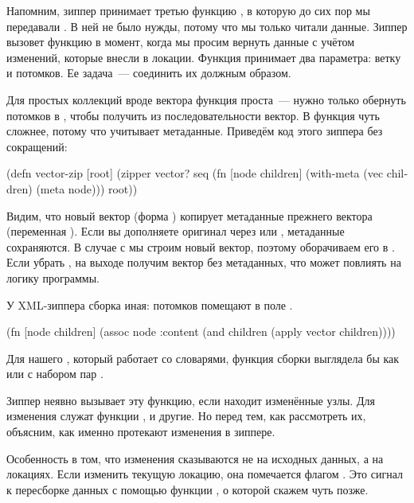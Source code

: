 Напомним, зиппер принимает третью функцию , в которую до сих пор мы
передавали . В ней не было нужды, потому что мы только читали
данные. Зиппер вызовет функцию в момент, когда мы просим вернуть данные с учётом
изменений, которые внесли в локации. Функция принимает два параметра: ветку и
потомков. Ее задача~--- соединить их должным образом.

Для простых коллекций вроде вектора функция проста~--- нужно только обернуть
потомков в , чтобы получить из последовательности вектор. В 
функция чуть сложнее, потому что учитывает метаданные. Приведём код этого
зиппера без сокращений:

\begin{english}
  \begin{clojure}
(defn vector-zip
  [root]
  (zipper vector?
          seq
          (fn [node children]
            (with-meta (vec children) (meta node)))
          root))
  \end{clojure}
\end{english}

Видим, что новый вектор (форма ) копирует метаданные прежнего
вектора (переменная ). Если вы дополняете оригинал через  или
, метаданные сохраняются. В случае с  мы строим новый вектор,
поэтому оборачиваем его в . Если убрать , на выходе
получим вектор без метаданных, что может повлиять на логику программы.

У XML-зиппера сборка иная: потомков помещают в поле .

\begin{english}
  \begin{clojure}
(fn [node children]
  (assoc node :content (and children (apply vector children))))
  \end{clojure}
\end{english}

Для нашего , который работает со словарями, функция сборки выглядела бы
как  или  с набором пар .

Зиппер неявно вызывает эту функцию, если находит изменённые узлы. Для изменения
служат функции ,  и другие. Но перед тем, как рассмотреть
их, объясним, как именно протекают изменения в зиппере.

Особенность в том, что изменения сказываются не на исходных данных, а на
локациях. Если изменить текущую локацию, она помечается флагом . Это
сигнал к пересборке данных с помощью функции , о которой скажем чуть
позже.

